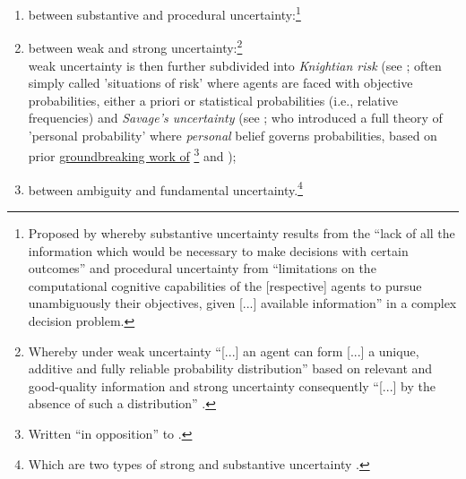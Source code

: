 \documentclass[a4paper,12pt,oneside,pointednumbers,bibtotoc,bigheadings,liststotoc]{scrbook}
\begin{document}
\begin{enumerate}
	\item between substantive and procedural uncertainty:\footnote{Proposed by \citet[p. 145]{dosiandegidi:91} whereby substantive uncertainty results from the ``lack of all the information which would be necessary to make decisions with certain outcomes'' and procedural uncertainty from ``limitations on the computational cognitive capabilities of the [respective] agents to pursue unambiguously their objectives, given [...] available information'' in a complex decision problem. }
	\item between weak and strong uncertainty:\footnote{Whereby under weak uncertainty ``[...] an agent can form [...] a unique, additive and fully reliable probability distribution'' based on relevant and good-quality information and strong uncertainty consequently ``[...] by the absence of such a distribution'' \citep[p. 622/623]{dequech:14}.} \\
	weak uncertainty is then further subdivided into \textit{Knightian risk} (see \citet{knight:21}; often simply called 'situations of risk' where agents are faced with objective probabilities, either a priori or statistical probabilities (i.e., relative frequencies) and \textit{Savage's uncertainty} (see \citet{savage:54}; who introduced a full theory of 'personal probability' where \textit{personal} belief governs probabilities, based on prior \href{https://archive.org/stream/in.ernet.dli.2015.223806/2015.223806.The-Foundations#page/n289/mode/2up}{groundbreaking work of} \href{http://www.brunodefinetti.it/Link/Subjective%20Expected%20Utility%20-%20Intro.htm}{\citet{ramsey:26}\footnote{Written ``in opposition'' to \citet{keynes:21}.} and \citet{finetti:37}});
	\item between ambiguity and fundamental uncertainty.\footnote{Which are two types of strong and substantive uncertainty \citep{dequesh:00}.}
\end{enumerate}
\vspace{1cm}
\end{document}
